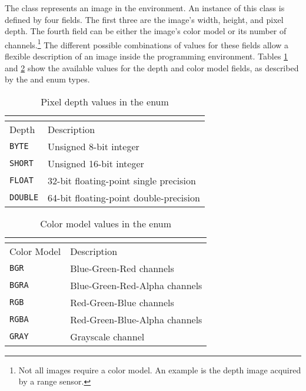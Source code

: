 The \ImageBuffer{} class represents an image in the \RD{} environment. An instance of this class is defined 
by four fields. The first three are the image's width, height, and pixel depth. The fourth field can be either
the image's color model or its number of channels.\footnote{Not all images require a color model. An 
example is the depth image acquired by a range sensor.} 
The different possible combinations of values for these fields allow a flexible description of an image inside
the programming environment. Tables \ref{imagebufferdepth} and \ref{imagebuffercolormodel} show the 
available values for the depth and color model fields, as described by the \ImageBufferDepth{} and 
\ImageBufferColorModel{} enum types.

\begin{table}[ht]
\caption{Pixel depth values in the \ImageBufferDepth{} enum}
\begin{center}
\begin{tabular}{| l | l |}
	\multicolumn{2}{c}{\ImageBufferDepth{}} \\
	\hline 
	Depth 			& Description \\
	\hline \hline
	\texttt{BYTE} 		& Unsigned 8-bit integer \\
	\texttt{SHORT}	 	& Unsigned 16-bit integer \\
	\texttt{FLOAT}	 	& 32-bit floating-point single precision \\
	\texttt{DOUBLE} 	& 64-bit floating-point double-precision \\
	\hline
\end{tabular}
\end{center}
\label{imagebufferdepth}
\end{table}

\begin{table}[ht]
\caption{Color model values in the \ImageBufferColorModel{} enum}
\begin{center}
\begin{tabular}{| l | l |}
	\multicolumn{2}{c}{\ImageBufferColorModel{}} \\
	\hline 
	Color Model 		& Description \\
	\hline \hline
	\texttt{BGR} 		& Blue-Green-Red channels \\
	\texttt{BGRA} 		& Blue-Green-Red-Alpha channels \\
	\texttt{RGB}	 	& Red-Green-Blue channels \\
	\texttt{RGBA}	 	& Red-Green-Blue-Alpha channels \\
	\texttt{GRAY}	 	& Grayscale channel \\
	\hline
\end{tabular}
\end{center}
\label{imagebuffercolormodel}
\end{table}

